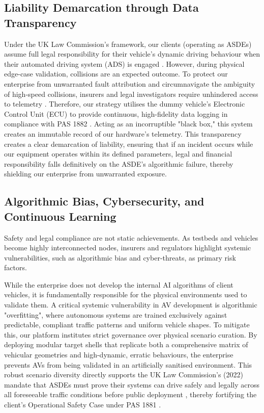 \subsection{Liability Demarcation through Data Transparency}

Under the UK Law Commission's framework, our clients (operating as ASDEs) assume full legal responsibility for their vehicle's dynamic driving behaviour when their automated driving system (ADS) is engaged \cite{lawcom_avs_2024}. However, during physical edge-case validation, collisions are an expected outcome. To protect our enterprise from unwarranted fault attribution and circumnavigate the ambiguity of high-speed collisions, insurers and legal investigators require unhindered access to telemetry \cite{thatcham_2026}. Therefore, our strategy utilises the dummy vehicle's Electronic Control Unit (ECU) to provide continuous, high-fidelity data logging in compliance with PAS 1882 \cite{pas1882}. Acting as an incorruptible "black box," this system creates an immutable record of our hardware's telemetry. This transparency creates a clear demarcation of liability, ensuring that if an incident occurs while our equipment operates within its defined parameters, legal and financial responsibility falls definitively on the ASDE's algorithmic failure, thereby shielding our enterprise from unwarranted exposure.

\subsection{Algorithmic Bias, Cybersecurity, and Continuous Learning}

Safety and legal compliance are not static achievements. As testbeds and vehicles become highly interconnected nodes, insurers and regulators highlight systemic vulnerabilities, such as algorithmic bias and cyber-threats, as primary risk factors.

While the enterprise does not develop the internal AI algorithms of client vehicles, it is fundamentally responsible for the physical environments used to validate them. A critical systemic vulnerability in AV development is algorithmic "overfitting", where autonomous systems are trained exclusively against predictable, compliant traffic patterns and uniform vehicle shapes. To mitigate this, our platform institutes strict governance over physical scenario curation. By deploying modular target shells that replicate both a comprehensive matrix of vehicular geometries and high-dynamic, erratic behaviours, the enterprise prevents AVs from being validated in an artificially sanitised environment. This robust scenario diversity directly supports the UK Law Commission’s (2022) mandate that ASDEs must prove their systems can drive safely and legally across all foreseeable traffic conditions before public deployment \cite[pp.~49, 81--82, 87]{lawcom_2022}, thereby fortifying the client’s Operational Safety Case under PAS 1881 \cite{pas1881}.

